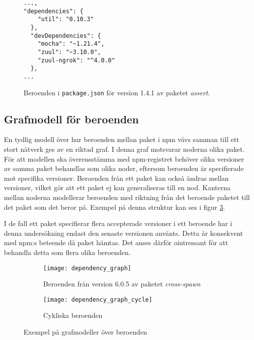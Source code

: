 \lstset{language=Java}
\begin{figure}[h]
  \center
  \begin{minipage}[c]{5cm}
    \begin{lstlisting}
...,
"dependencies": {
    "util": "0.10.3"
  },
  "devDependencies": {
    "mocha": "~1.21.4",
    "zuul": "~3.10.0",
    "zuul-ngrok": "^4.0.0"
  },
...
    \end{lstlisting}
  \end{minipage}
  \caption{Beroenden i \texttt{package.json} för version 1.4.1 av paketet \textit{assert}.\cite{npm-assert}}
  \label{fig:package.json}
\end{figure}

\subsection{Grafmodell för beroenden}
\label{subsec:joel_o-grafmodell}
En tydlig modell över hur beroenden mellan paket i npm vävs samman till ett stort nätverk ges av en riktad graf. I denna graf motsvarar noderna olika paket. För att modellen ska överensstämma med npm-registret behöver olika versioner av samma paket behandlas som olika noder, eftersom beroenden är specifierade mot specifika versioner. Beroenden från ett paket kan också ändras mellan versioner, vilket gör att ett paket ej kan generaliseras till en nod. Kanterna mellan noderna modellerar beroenden med riktning från det beroende paketet till det paket som det beror på. Exempel på denna struktur kan ses i figur \ref{fig:beroende-graf-cykel}.

I de fall ett paket specifierar flera accepterade versioner i ett beroende har i denna undersökning endast den senaste versionen använts. Detta är konsekvent med npm:s beteende då paket hämtas. Det anses därför ointressant för att behandla detta som flera olika beroenden.

\begin{figure}
  \captionsetup{justification=centering}
  \centering
  \begin{subfigure}[t]{.5\textwidth}
    \begin{minipage}[t][8cm][b]{0,5\textwidth}
      \vspace*{\fill}
        \texttt{[image: dependency\_graph]}
      \vspace*{\fill}
    \end{minipage}
    \caption{Beroenden från version 6.0.5 av paketet \textit{cross-spawn}}
    \label{fig:beroende-graf}
  \end{subfigure}%
  \begin{subfigure}[t]{.5\textwidth}
    \begin{minipage}[t][8cm][b]{0,5\textwidth}
      \vspace*{\fill}
      \texttt{[image: dependency\_graph\_cycle]}
      \vspace*{\fill}
    \end{minipage}
    \caption{Cykliska beroenden}
    \label{fig:beroende-graf-cykel}
  \end{subfigure}
  \caption{Exempel på grafmodeller över beroenden}
  \label{fig:grafmodell}
\end{figure}

